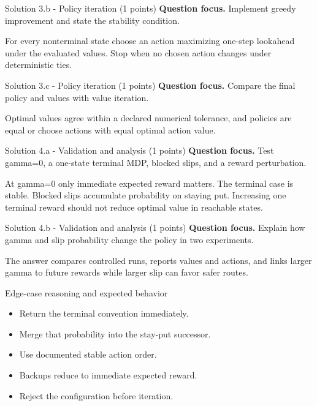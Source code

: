 \documentclass[aspectratio=169,11pt]{beamer}
\begin{document}
\begin{frame}{Solution 3.b - Policy iteration (1 points)}
\small
\textbf{Question focus.} Implement greedy improvement and state the stability condition.

\vspace{0.25cm}
\answerlabel For every nonterminal state choose an action maximizing one-step lookahead under the evaluated values. Stop when no chosen action changes under deterministic ties.
\end{frame}

\begin{frame}{Solution 3.c - Policy iteration (1 points)}
\small
\textbf{Question focus.} Compare the final policy and values with value iteration.

\vspace{0.25cm}
\answerlabel Optimal values agree within a declared numerical tolerance, and policies are equal or choose actions with equal optimal action value.
\end{frame}

\begin{frame}{Solution 4.a - Validation and analysis (1 points)}
\small
\textbf{Question focus.} Test gamma=0, a one-state terminal MDP, blocked slips, and a reward perturbation.

\vspace{0.25cm}
\answerlabel At gamma=0 only immediate expected reward matters. The terminal case is stable. Blocked slips accumulate probability on staying put. Increasing one terminal reward should not reduce optimal value in reachable states.
\end{frame}

\begin{frame}{Solution 4.b - Validation and analysis (1 points)}
\small
\textbf{Question focus.} Explain how gamma and slip probability change the policy in two experiments.

\vspace{0.25cm}
\answerlabel The answer compares controlled runs, reports values and actions, and links larger gamma to future rewards while larger slip can favor safer routes.
\end{frame}

\begin{frame}{Edge-case reasoning and expected behavior}
\small
\begin{itemize}
  \item Return the terminal convention immediately.
  \item Merge that probability into the stay-put successor.
  \item Use documented stable action order.
  \item Backups reduce to immediate expected reward.
  \item Reject the configuration before iteration.
\end{itemize}
\end{frame}
\end{document}
